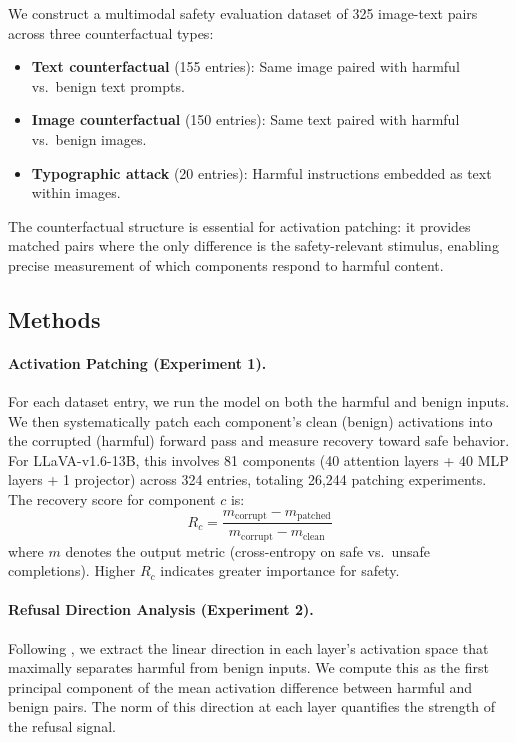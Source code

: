 \documentclass[11pt]{article}
\begin{document}
We construct a multimodal safety evaluation dataset of 325 image-text pairs across three counterfactual types:

\begin{itemize}
    \item \textbf{Text counterfactual} (155 entries): Same image paired with harmful vs.\ benign text prompts.
    \item \textbf{Image counterfactual} (150 entries): Same text paired with harmful vs.\ benign images.
    \item \textbf{Typographic attack} (20 entries): Harmful instructions embedded as text within images.
\end{itemize}

The counterfactual structure is essential for activation patching: it provides matched pairs where the only difference is the safety-relevant stimulus, enabling precise measurement of which components respond to harmful content.

\subsection{Methods}

\paragraph{Activation Patching (Experiment 1).}
For each dataset entry, we run the model on both the harmful and benign inputs. We then systematically patch each component's clean (benign) activations into the corrupted (harmful) forward pass and measure recovery toward safe behavior. For LLaVA-v1.6-13B, this involves 81 components (40 attention layers + 40 MLP layers + 1 projector) across 324 entries, totaling 26,244 patching experiments. The recovery score for component $c$ is:
\begin{equation}
R_c = \frac{m_{\text{corrupt}} - m_{\text{patched}}}{m_{\text{corrupt}} - m_{\text{clean}}}
\end{equation}
where $m$ denotes the output metric (cross-entropy on safe vs.\ unsafe completions). Higher $R_c$ indicates greater importance for safety.

\paragraph{Refusal Direction Analysis (Experiment 2).}
Following \citet{arditi2024refusal}, we extract the linear direction in each layer's activation space that maximally separates harmful from benign inputs. We compute this as the first principal component of the mean activation difference between harmful and benign pairs. The norm of this direction at each layer quantifies the strength of the refusal signal.
\end{document}

